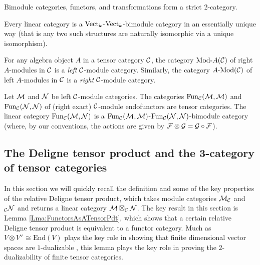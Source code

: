 \documentclass{amsart}
\begin{document}
%
Bimodule categories, functors, and transformations form a strict 2-category.  %

\begin{example}
	Every linear category is a $\mathrm{Vect}_k$-$\mathrm{Vect}_k$-bimodule category in an essentially unique way (that is any two such structures are naturally isomorphic via a unique isomorphism). %
\end{example}

\begin{example} \label{ex:ModulesAreModules}
	For any algebra object $A$ in a tensor category $\mathcal C$, the category $\Mod{}{A}(\cC)$ of right $A$-modules in $\mathcal C$ is a \emph{left} $\mathcal C$-module category.  Similarly, the category $\Mod{A}{}(\cC)$ of left $A$-modules in $\mathcal C$ is a \emph{right} $\mathcal C$-module category.
\end{example}

\begin{example}
	Let $\mathcal M$ and $\mathcal N$ be left $\mathcal C$-module categories. The categories $\operatorname{Fun}_{\mathcal C}(\mathcal M, \mathcal M)$ and $\operatorname{Fun}_{\mathcal C}(\mathcal N, \mathcal N)$ of (right exact) $\mathcal C$-module endofunctors are tensor categories. The linear category $\operatorname{Fun}_{\mathcal C}(\mathcal M, \mathcal N)$ is a $\operatorname{Fun}_{\mathcal C}(\mathcal M, \mathcal M)$-$\operatorname{Fun}_{\mathcal C}(\mathcal N, \mathcal N)$-bimodule category (where, by our conventions, the actions are given by $\mathcal F \otimes \mathcal G = \mathcal G \circ \mathcal F$). 
\end{example}


\subsection{The Deligne tensor product and the 3-category of tensor categories} \label{sec:tc-deligne}

In this section we will quickly recall the definition and some of the key properties of the relative Deligne tensor product, which takes module categories $\mathcal M_\mathcal C$ and ${}_\mathcal C \mathcal N$ and returns a linear category $\mathcal M \boxtimes_\mathcal C \mathcal N$.  The key result in this section is Lemma \ref{Lma:FunctorsAsATensorPdt}, which shows that a certain relative Deligne tensor product is equivalent to a functor category.  Much as $V \otimes V^\vee \cong \mathrm{End}(V)$ plays the key role in showing that finite dimensional vector spaces are $1$-dualizable \cite[Ex. 1.1.9]{lurie-ch}, this lemma plays the key role in proving the $2$-dualizability of finite tensor categories.
\end{document}
